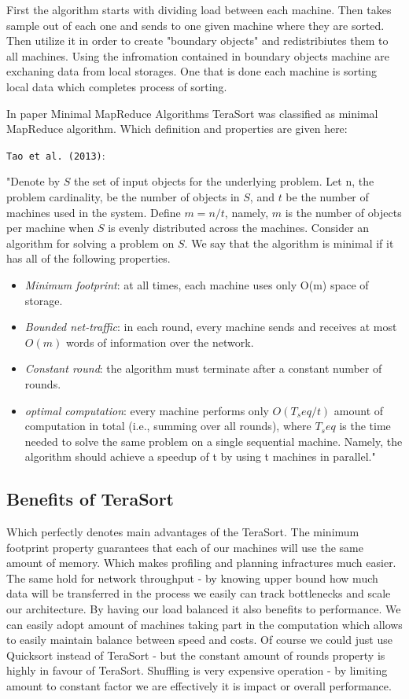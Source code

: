 First the algorithm starts with dividing load between each machine. Then takes sample 
out of each one and sends to one given machine where they are sorted.
Then utilize it in order to create "boundary objects" and redistribiutes them
to all machines. Using the infromation contained in boundary objects 
machine are exchaning data from local storages.
One that is done each machine is sorting local data which completes process of sorting.

In paper Minimal MapReduce Algorithms TeraSort was classified as
minimal MapReduce algorithm. Which definition and properties are given
here:


\texttt{Tao et al. (2013)}\citep{minimalmapreduce}:

"Denote by $S$ the set of input objects 
for the underlying problem. Let n, the problem cardinality,
be the number of objects in $S$, and $t$ be the number of machines
used in the system. Define $m = n/t$, namely, $m$ is the number
of objects per machine when $S$ is evenly distributed across the
machines. Consider an algorithm for solving a problem on $S$.
We say that the algorithm is minimal if it has all of the following
properties.

\begin{itemize}
\item \emph{Minimum footprint}: at all times, each machine uses only
O(m) space of storage.
\item \emph{Bounded net-traffic}: in each round, every machine sends
and receives at most $O(m)$ words of information over the
network.
\item  \emph{Constant round}: the algorithm must terminate after a
constant number of rounds.
\item \emph{optimal computation}: every machine performs only
$O(T_seq /t)$ amount of computation in total (i.e., summing
over all rounds), where $T_seq$ is the time needed to solve the
same problem on a single sequential machine. Namely, the
algorithm should achieve a speedup of t by using t machines
in parallel." 
\end{itemize}


\subsection{Benefits of TeraSort}
Which perfectly denotes main advantages of the TeraSort. The minimum footprint property guarantees
that each of our machines will use the same amount of memory. Which makes profiling
and planning infractures much easier. The same hold for network throughput - by knowing
upper bound how much data will be transferred in the process we easily can track bottlenecks
and scale our architecture.
By having our load balanced it also benefits to performance. We can easily adopt amount of machines
taking part in the computation which allows to easily maintain balance between speed and costs.
Of course we could just use Quicksort instead of TeraSort - but the constant amount of rounds property
is highly in favour of TeraSort. Shuffling is very expensive operation - by limiting amount to constant
factor we are effectively it is impact or overall performance.
